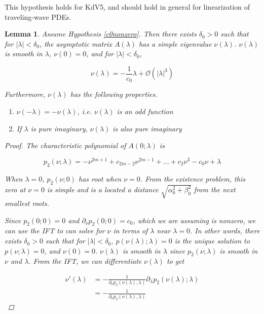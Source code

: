 \documentclass[12pt]{article}
\newtheorem{lemma}{Lemma}
\begin{document}
This hypothesis holds for KdV5, and should hold in general for linearization of traveling-wave PDEs.


\begin{lemma}\label{nulambdalemma}
Assume Hypothesis \ref{c0nonzero}. Then there exists $\delta_0 > 0$ such that for $|\lambda| < \delta_0$, the asymptotic matrix $A(\lambda)$ has a simple eigenvalue $\nu(\lambda)$. $\nu(\lambda)$ is smooth in $\lambda$, $\nu(0) = 0$, and for $|\lambda| < \delta_0$,

\begin{equation}\label{nulambda}
\nu(\lambda) = -\frac{1}{c_0} \lambda + \mathcal{O}(|\lambda|^3)
\end{equation}

Furthermore, $\nu(\lambda)$ has the following properties.

\begin{enumerate}
\item $\nu(-\lambda) = -\nu(\lambda)$, i.e. $\nu(\lambda)$ is an odd function 
\item If $\lambda$ is pure imaginary, $\nu(\lambda)$ is also pure imaginary
\end{enumerate}

\begin{proof}
The characteristic polynomial of $A(0; \lambda)$ is

\begin{equation}\label{charpolyA0lambda}
p_2(\nu; \lambda) = -\nu^{2m+1} + c_{2m-2} \nu^{2m-1} + \dots + c_2 \nu^3 - c_0 \nu + \lambda
\end{equation}

When $\lambda = 0$, $p_2(\nu; 0)$ has root when $\nu = 0$. From the existence problem, this zero at $\nu = 0$ is simple and is a located a distance $\sqrt{\alpha_0^2 + \beta_0^2}$ from the next smallest roots. 

Since $p_2(0; 0) = 0$ and $\partial_\nu p_2(0; 0) = c_0$, which we are assuming is nonzero, we can use the IFT to can solve for $\nu$ in terms of $\lambda$ near $\lambda = 0$. In other words, there exists $\delta_0 > 0$ such that for $|\lambda| < \delta_0$, $p(\nu(\lambda); \lambda) = 0$ is the unique solution to $p(\nu; \lambda) = 0$, and $\nu(0) = 0$. $\nu(\lambda)$ is smooth in $\lambda$ since $p_2(\nu; \lambda)$ is smooth in $\nu$ and $\lambda$. From the IFT, we can differentiate $\nu(\lambda)$ to get

\begin{align*}
\nu'(\lambda) &= -\frac{1}{\partial_\nu p_2(\nu(\lambda),\lambda) } \partial_\lambda p_2 ( \nu(\lambda); \lambda ) \\
&= -\frac{1}{\partial_\nu p_2(\nu(\lambda),\lambda) } 
\end{align*}


\end{proof}
\end{lemma}
\end{document}
